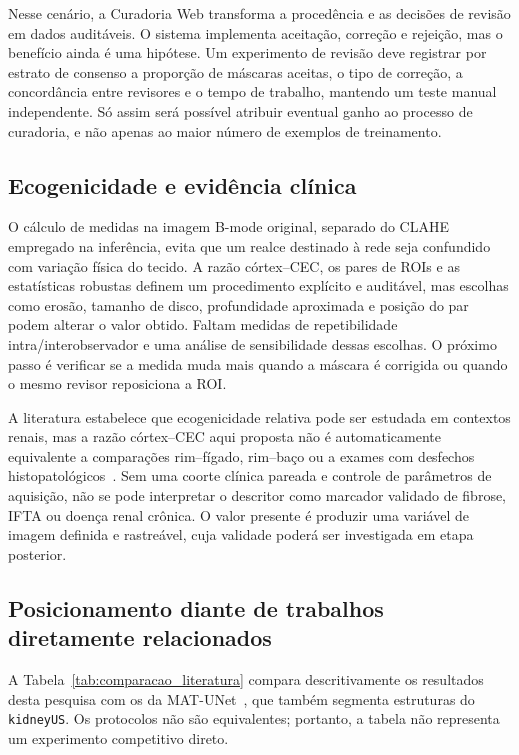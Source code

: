 \documentclass[12pt]{article}
\begin{document}
Nesse cenário, a Curadoria Web transforma a procedência e as decisões de revisão em dados auditáveis. O sistema implementa aceitação, correção e rejeição, mas o benefício ainda é uma hipótese. Um experimento de revisão deve registrar por estrato de consenso a proporção de máscaras aceitas, o tipo de correção, a concordância entre revisores e o tempo de trabalho, mantendo um teste manual independente. Só assim será possível atribuir eventual ganho ao processo de curadoria, e não apenas ao maior número de exemplos de treinamento.

\subsection{Ecogenicidade e evidência clínica}
O cálculo de medidas na imagem B-mode original, separado do CLAHE empregado na inferência, evita que um realce destinado à rede seja confundido com variação física do tecido. A razão córtex--CEC, os pares de ROIs e as estatísticas robustas definem um procedimento explícito e auditável, mas escolhas como erosão, tamanho de disco, profundidade aproximada e posição do par podem alterar o valor obtido. Faltam medidas de repetibilidade intra/interobservador e uma análise de sensibilidade dessas escolhas. O próximo passo é verificar se a medida muda mais quando a máscara é corrigida ou quando o mesmo revisor reposiciona a ROI.

A literatura estabelece que ecogenicidade relativa pode ser estudada em contextos renais, mas a razão córtex--CEC aqui proposta não é automaticamente equivalente a comparações rim--fígado, rim--baço ou a exames com desfechos histopatológicos~\cite{Manley2001,Moghazi2005,Beutler2024SRI,Zhao2025Echogenicity,Athavale2021}. Sem uma coorte clínica pareada e controle de parâmetros de aquisição, não se pode interpretar o descritor como marcador validado de fibrose, IFTA ou doença renal crônica. O valor presente é produzir uma variável de imagem definida e rastreável, cuja validade poderá ser investigada em etapa posterior.

\subsection{Posicionamento diante de trabalhos diretamente relacionados}
A Tabela~\ref{tab:comparacao_literatura} compara descritivamente os resultados desta pesquisa com os da MAT-UNet~\cite{Zuo2025RenalAttention}, que também segmenta estruturas do \texttt{kidneyUS}. Os protocolos não são equivalentes; portanto, a tabela não representa um experimento competitivo direto.
\end{document}
